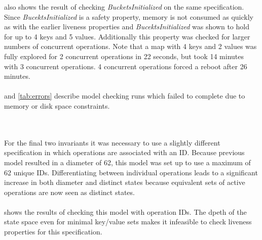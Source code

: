 \documentclass{uit-thesis}
\begin{document}
 also shows the result of checking \textit{BucketsInitialized} on the same specification. Since \textit{BucektsInitialized} is a safety property, memory is not consumed as quickly as with the earlier liveness properties and \textit{BucektsInitialized} was shown to hold for up to 4 keys and 5 values. Additionally this property was checked for larger numbers of concurrent operations. Note that a map with 4 keys and 2 values was fully explored for 2 concurrent operations in 22 seconds, but took 14 minutes with 3 concurrent operations. 4 concurrent operations forced a reboot after 26 minutes.
\\\\
 and \ref{tab:errors} describe model checking runs which failed to complete due to memory or disk space constraints.
\begin{table}
    \centering
    \caption{Model checking SOConcurrent with operation IDs}
    \label{tab:SOConcurrent_ID}
\end{table}
\\\\
For the final two invariants it was necessary to use a slightly different specification in which operations are associated with an ID. Because previous model resulted in a diameter of 62, this model was set up to use a maximum of 62 unique IDs. Differentiating between individual operations leads to a significant increase in both diameter and distinct states because equivalent sets of active operations are now seen as distinct states.
\\\\
 shows the results of checking this model with operation IDs. The dpeth of the state space even for minimal key/value sets makes it infeasible to check liveness properties for this specification.
\end{document}
